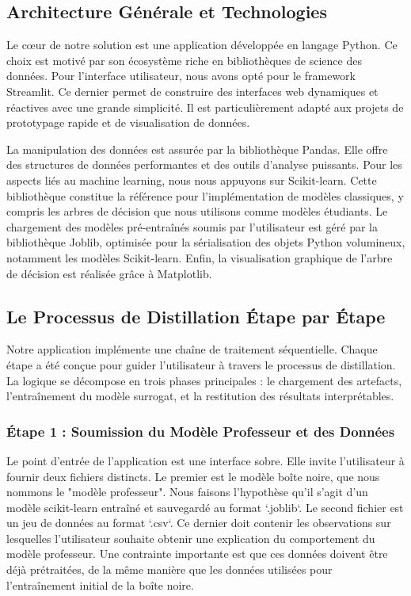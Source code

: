 \documentclass{article}
\begin{document}
\subsection{Architecture Générale et Technologies}

\quad Le cœur de notre solution est une application développée en langage Python. Ce choix est motivé par son écosystème riche en bibliothèques de science des données. Pour l'interface utilisateur, nous avons opté pour le framework Streamlit. Ce dernier permet de construire des interfaces web dynamiques et réactives avec une grande simplicité. Il est particulièrement adapté aux projets de prototypage rapide et de visualisation de données.

La manipulation des données est assurée par la bibliothèque Pandas. Elle offre des structures de données performantes et des outils d'analyse puissants. Pour les aspects liés au machine learning, nous nous appuyons sur Scikit-learn. Cette bibliothèque constitue la référence pour l'implémentation de modèles classiques, y compris les arbres de décision que nous utilisons comme modèles étudiants. Le chargement des modèles pré-entraînés soumis par l'utilisateur est géré par la bibliothèque Joblib, optimisée pour la sérialisation des objets Python volumineux, notamment les modèles Scikit-learn. Enfin, la visualisation graphique de l'arbre de décision est réalisée grâce à Matplotlib.

\subsection{Le Processus de Distillation Étape par Étape}

\quad Notre application implémente une chaîne de traitement séquentielle. Chaque étape a été conçue pour guider l'utilisateur à travers le processus de distillation. La logique se décompose en trois phases principales : le chargement des artefacts, l'entraînement du modèle surrogat, et la restitution des résultats interprétables.

\subsubsection{Étape 1 : Soumission du Modèle Professeur et des Données}

\quad Le point d'entrée de l'application est une interface sobre. Elle invite l'utilisateur à fournir deux fichiers distincts. Le premier est le modèle boîte noire, que nous nommons le "modèle professeur". Nous faisons l'hypothèse qu'il s'agit d'un modèle scikit-learn entraîné et sauvegardé au format `.joblib`. Le second fichier est un jeu de données au format `.csv`. Ce dernier doit contenir les observations sur lesquelles l'utilisateur souhaite obtenir une explication du comportement du modèle professeur. Une contrainte importante est que ces données doivent être déjà prétraitées, de la même manière que les données utilisées pour l'entraînement initial de la boîte noire.
\end{document}
